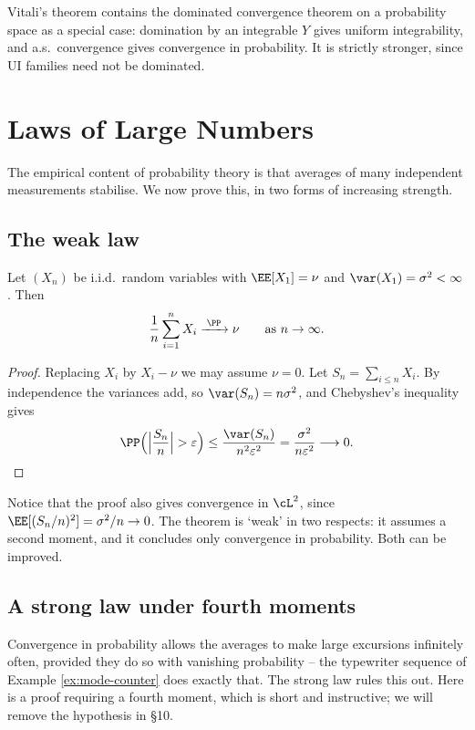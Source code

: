 \begin{remark}
	Vitali's theorem contains the dominated convergence theorem on a probability space as a special case: domination by an integrable $Y$ gives uniform integrability, and a.s.\ convergence gives convergence in probability. It is strictly stronger, since UI families need not be dominated.
\end{remark}

\section{Laws of Large Numbers}

The empirical content of probability theory is that averages of many independent measurements stabilise. We now prove this, in two forms of increasing strength.

\subsection{The weak law}

\begin{theorem}\label{thm:wlln}
	Let $(X_n)$ be i.i.d.\ random variables with $\EE[X_1]=\nu$ and $\var(X_1)=\sigma^2<\infty$. Then
	$$
	\frac{1}{n}\sum_{i=1}^n X_i \xrightarrow{\;\PP\;} \nu \qquad \text{as } n \to\infty.
	$$
\end{theorem}
\begin{proof}
	Replacing $X_i$ by $X_i - \nu$ we may assume $\nu=0$. Let $S_n = \sum_{i\leq n}X_i$. By independence the variances add, so $\var(S_n) = n\sigma^2$, and Chebyshev's inequality gives
	$$
	\PP\Big( \Big|\frac{S_n}{n}\Big|>\varepsilon\Big) \leq \frac{\var(S_n)}{n^2\varepsilon^2}=\frac{\sigma^2}{n\varepsilon^2}\longrightarrow 0. \qedhere
	$$
\end{proof}

Notice that the proof also gives convergence in $\cL^2$, since $\EE[(S_n/n)^2]=\sigma^2/n\to0$. The theorem is `weak' in two respects: it assumes a second moment, and it concludes only convergence in probability. Both can be improved.

\subsection{A strong law under fourth moments}

Convergence in probability allows the averages to make large excursions infinitely often, provided they do so with vanishing probability -- the typewriter sequence of Example \ref{ex:mode-counter} does exactly that. The strong law rules this out. Here is a proof requiring a fourth moment, which is short and instructive; we will remove the hypothesis in \S10.

